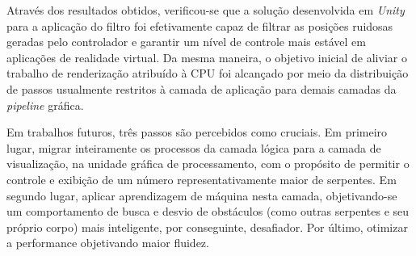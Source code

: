 \documentclass{vgtc}                          %
\begin{document}
Através dos resultados obtidos, verificou-se que a solução desenvolvida em \textit{Unity} para a aplicação do filtro foi efetivamente capaz de filtrar as posições ruidosas geradas pelo controlador e garantir um nível de controle mais estável em aplicações de realidade virtual. Da mesma maneira, o objetivo inicial de aliviar o trabalho de renderização atribuído à CPU foi alcançado por meio da distribuição de passos usualmente restritos à camada de aplicação para demais camadas da \textit{pipeline} gráfica.

Em trabalhos futuros, três passos são percebidos como cruciais. Em primeiro lugar, migrar inteiramente os processos da camada lógica para a camada de visualização, na unidade gráfica de processamento, com o propósito de permitir o controle e exibição de um número representativamente maior de serpentes. Em segundo lugar, aplicar aprendizagem de máquina nesta camada, objetivando-se um comportamento de busca e desvio de obstáculos (como outras serpentes e seu próprio corpo) mais inteligente, por conseguinte, desafiador. Por último, otimizar a performance objetivando maior fluidez.



\end{document}
